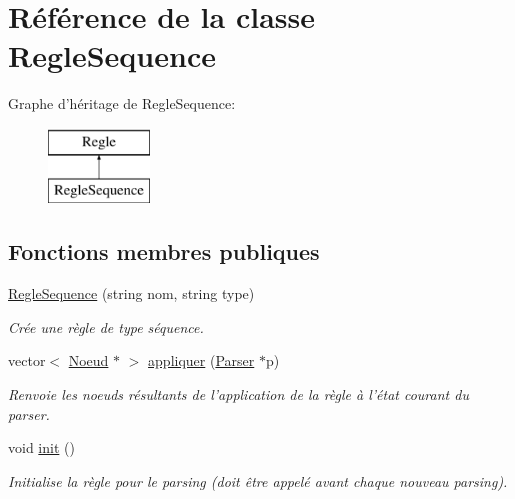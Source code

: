 \hypertarget{class_regle_sequence}{\section{Référence de la classe Regle\-Sequence}
\label{class_regle_sequence}
}
Graphe d'héritage de Regle\-Sequence\-:\begin{figure}[H]
\begin{center}
\leavevmode
\includegraphics[height=2.000000cm]{class_regle_sequence}
\end{center}
\end{figure}
\subsection*{Fonctions membres publiques}
\begin{DoxyCompactItemize}
\item 
\hyperlink{class_regle_sequence_a7cba8d2491d2f5c1854f6d9e40db018d}{Regle\-Sequence} (string nom, string type)
\begin{DoxyCompactList}\small\item\em Crée une règle de type séquence. \end{DoxyCompactList}\item 
vector$<$ \hyperlink{class_noeud}{Noeud} $\ast$ $>$ \hyperlink{class_regle_sequence_a523224e9cbace57e6a96a957b8fb04c4}{appliquer} (\hyperlink{class_parser}{Parser} $\ast$p)
\begin{DoxyCompactList}\small\item\em Renvoie les noeuds résultants de l'application de la règle à l'état courant du parser. \end{DoxyCompactList}\item 
void \hyperlink{class_regle_sequence_af30c68a9b9a2358e248d5f4edc4a4074}{init} ()
\begin{DoxyCompactList}\small\item\em Initialise la règle pour le parsing (doit être appelé avant chaque nouveau parsing). \end{DoxyCompactList}\end{DoxyCompactItemize}
